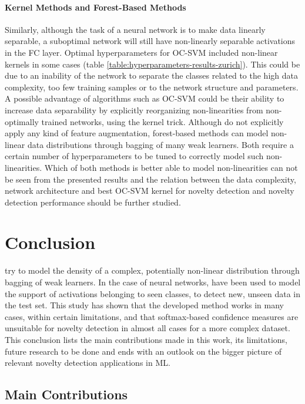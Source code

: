 \documentclass[10pt]{article}
\begin{document}
\paragraph{Kernel Methods and Forest-Based Methods} Similarly, although the task of a neural network is to make data linearly separable, a suboptimal network will still have non-linearly separable activations in the \gls{FC} layer. Optimal hyperparameters for \gls{OC-SVM} included non-linear kernels in some cases (table \ref{table:hyperparameters-results-zurich}). This could be due to an inability of the network to separate the classes related to the high data complexity, too few training samples or to the network structure and parameters. A possible advantage of algorithms such as \gls{OC-SVM} could be their ability to increase data separability by explicitly reorganizing non-linearities from non-optimally trained networks, using the kernel trick. Although  do not explicitly apply any kind of feature augmentation, forest-based methods can model non-linear data distributions through bagging of many weak learners. Both require a certain number of hyperparameters to be tuned to correctly model such non-linearities. Which of both methods is better able to model non-linearities can not be seen from the presented results and the relation between the data complexity, network architecture and best \gls{OC-SVM} kernel for novelty detection and novelty detection performance should be further studied.

\section{Conclusion}
\label{sec:conclusion}

 try to model the density of a complex, potentially non-linear distribution through bagging of weak learners. In the case of neural networks,  have been used to model the support of activations belonging to seen classes, to detect new, unseen data in the test set. This study has shown that the developed method works in many cases, within certain limitations, and that softmax-based confidence measures are unsuitable for novelty detection in almost all cases for a more complex dataset. This conclusion lists the main contributions made in this work, its limitations, future research to be done and ends with an outlook on the bigger picture of relevant novelty detection applications in \gls{ML}.

\subsection{Main Contributions}
\label{subsec:contributions}
\end{document}
